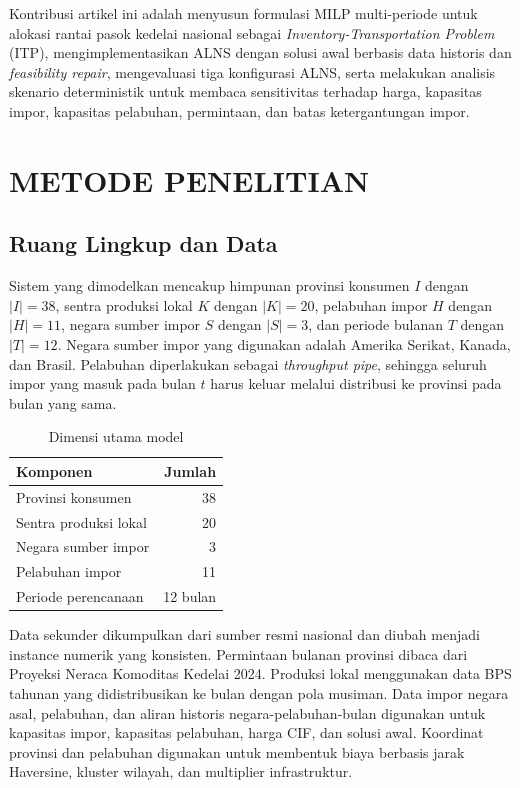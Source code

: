 \documentclass[journal]{IEEEtran}
\theoremstyle{definition}
\theoremstyle{definition}
\theoremstyle{plain}
\begin{document}
     Kontribusi artikel ini adalah menyusun formulasi MILP multi-periode untuk alokasi rantai pasok kedelai nasional sebagai \textit{Inventory-Transportation Problem} (ITP), mengimplementasikan ALNS dengan solusi awal berbasis data historis dan \textit{feasibility repair}, mengevaluasi tiga konfigurasi ALNS, serta melakukan analisis skenario deterministik untuk membaca sensitivitas terhadap harga, kapasitas impor, kapasitas pelabuhan, permintaan, dan batas ketergantungan impor.

    \section{METODE PENELITIAN}
    \subsection{Ruang Lingkup dan Data}
    Sistem yang dimodelkan mencakup himpunan provinsi konsumen $I$ dengan $|I|=38$, sentra produksi lokal $K$ dengan $|K|=20$, pelabuhan impor $H$ dengan $|H|=11$, negara sumber impor $S$ dengan $|S|=3$, dan periode bulanan $T$ dengan $|T|=12$. Negara sumber impor yang digunakan adalah Amerika Serikat, Kanada, dan Brasil. Pelabuhan diperlakukan sebagai \textit{throughput pipe}, sehingga seluruh impor yang masuk pada bulan $t$ harus keluar melalui distribusi ke provinsi pada bulan yang sama.

    \begin{table}[H]
    \centering
    \caption{Dimensi utama model}
    \label{tab:dimensi}
    \begin{tabular}{lr}
    \toprule
    \textbf{Komponen} & \textbf{Jumlah} \\
    \midrule
    Provinsi konsumen & 38 \\
    Sentra produksi lokal & 20 \\
    Negara sumber impor & 3 \\
    Pelabuhan impor & 11 \\
    Periode perencanaan & 12 bulan \\
    \bottomrule
    \end{tabular}
    \end{table}

    Data sekunder dikumpulkan dari sumber resmi nasional dan diubah menjadi instance numerik yang konsisten. Permintaan bulanan provinsi dibaca dari Proyeksi Neraca Komoditas Kedelai 2024. Produksi lokal menggunakan data BPS tahunan yang didistribusikan ke bulan dengan pola musiman. Data impor negara asal, pelabuhan, dan aliran historis negara-pelabuhan-bulan digunakan untuk kapasitas impor, kapasitas pelabuhan, harga CIF, dan solusi awal. Koordinat provinsi dan pelabuhan digunakan untuk membentuk biaya berbasis jarak Haversine, kluster wilayah, dan multiplier infrastruktur.
\end{document}
